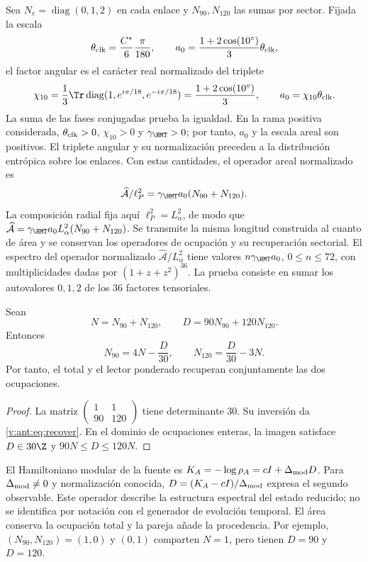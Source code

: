 Sea $N_e=\operatorname{diag}(0,1,2)$ en cada enlace y
$N_{90},N_{120}$ las sumas por sector. Fijada la escala
\[
\theta_{\rm clk}=\frac{C^*}{6}\frac{\pi}{180},\qquad
a_0=\frac{1+2\cos(10^\circ)}3\theta_{\rm clk},
\]
el factor angular es el carácter real normalizado del triplete
\begin{equation}
 \chi_{10}=\frac13\Tr\operatorname{diag}
       (1,e^{i\pi/18},e^{-i\pi/18})
 =\frac{1+2\cos(10^\circ)}3,
 \qquad a_0=\chi_{10}\theta_{\rm clk}.
 \label{v:ant:eq:ii-area-caracter-triplete}
\end{equation}
La suma de las fases conjugadas prueba la igualdad. En la rama positiva
considerada, \(\theta_{\rm clk}>0\), \(\chi_{10}>0\) y
\(\gamma_{\HMT}>0\); por tanto, \(a_0\) y la escala areal son
positivos. El triplete angular y su normalización preceden a la
distribución entrópica sobre los enlaces. Con estas cantidades,
el operador areal normalizado es
\[
\widehat{\mathcal A}/\ell_P^2
=\gamma_{\HMT}a_0(N_{90}+N_{120}).
\]
La composición radial fija aquí \(\ell_P^2=L_\alpha^2\), de modo que
\(\widehat{\mathcal A}=\gamma_{\HMT}a_0L_\alpha^2(N_{90}+N_{120})\).
Se transmite la misma longitud construida al cuanto de área y se
conservan los operadores de ocupación y su recuperación sectorial.
El espectro del operador normalizado \(\widehat{\mathcal A}/L_\alpha^2\)
tiene valores $n\gamma_{\HMT}a_0$, $0\le n\le72$,
con multiplicidades dadas por $(1+z+z^2)^{36}$.
La prueba consiste en sumar los autovalores $0,1,2$ de los
36 factores tensoriales.

\begin{theorem}
Sean
\[
N=N_{90}+N_{120},\qquad D=90N_{90}+120N_{120}.
\]
Entonces
\begin{equation}
N_{90}=4N-\frac D{30},\qquad
N_{120}=\frac D{30}-3N.
\label{v:ant:eq:recover}
\end{equation}
Por tanto, el total y el lector ponderado recuperan conjuntamente
las dos ocupaciones.
\end{theorem}
\begin{proof}
La matriz $\left(\begin{smallmatrix}1&1\\90&120\end{smallmatrix}\right)$
tiene determinante $30$. Su inversión da \eqref{v:ant:eq:recover}.
En el dominio de ocupaciones enteras, la imagen satisface
$D\in30\Z$ y $90N\le D\le120N$.
\end{proof}

El Hamiltoniano modular de la fuente es
$K_A=-\log\rho_A=cI+\Delta_{\rm mod}D$.
Para $\Delta_{\rm mod}\ne0$ y normalización conocida,
$D=(K_A-cI)/\Delta_{\rm mod}$ expresa el segundo observable.
Este operador describe la estructura espectral del estado reducido;
no se identifica por notación con el generador de evolución temporal.
El área conserva la ocupación total y la pareja añade la procedencia.
Por ejemplo, $(N_{90},N_{120})=(1,0)$ y $(0,1)$ comparten $N=1$,
pero tienen $D=90$ y $D=120$.

